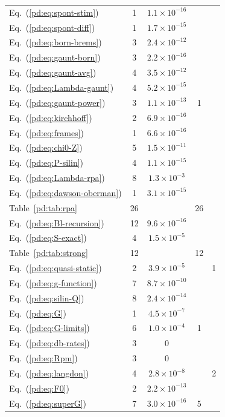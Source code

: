 \begin{longtable}{L{4.0cm}cccc}
Eq.~(\ref*{pd:eq:spont-stim}) & 1 & $1.1\times10^{-16}$ &  & \\
Eq.~(\ref*{pd:eq:spont-diff}) & 1 & $1.7\times10^{-15}$ &  & \\
Eq.~(\ref*{pd:eq:born-brems}) & 3 & $2.4\times10^{-12}$ &  & \\
Eq.~(\ref*{pd:eq:gaunt-born}) & 3 & $2.2\times10^{-16}$ &  & \\
Eq.~(\ref*{pd:eq:gaunt-avg}) & 4 & $3.5\times10^{-12}$ &  & \\
Eq.~(\ref*{pd:eq:Lambda-gaunt}) & 4 & $5.2\times10^{-15}$ &  & \\
Eq.~(\ref*{pd:eq:gaunt-power}) & 3 & $1.1\times10^{-13}$ & 1 & \\
Eq.~(\ref*{pd:eq:kirchhoff}) & 2 & $6.9\times10^{-16}$ &  & \\
Eq.~(\ref*{pd:eq:frames}) & 1 & $6.6\times10^{-16}$ &  & \\
Eq.~(\ref*{pd:eq:chi0-Z}) & 5 & $1.5\times10^{-11}$ &  & \\
Eq.~(\ref*{pd:eq:P-silin}) & 4 & $1.1\times10^{-15}$ &  & \\
Eq.~(\ref*{pd:eq:Lambda-rpa}) & 8 & $1.3\times10^{-3}$ &  & \\
Eq.~(\ref*{pd:eq:dawson-oberman}) & 1 & $3.1\times10^{-15}$ &  & \\
Table~\ref*{pd:tab:rpa} & 26 &  & 26 & \\
Eq.~(\ref*{pd:eq:Bl-recursion}) & 12 & $9.6\times10^{-16}$ &  & \\
Eq.~(\ref*{pd:eq:S-exact}) & 4 & $1.5\times10^{-5}$ &  & \\
Table~\ref*{pd:tab:strong} & 12 &  & 12 & \\
Eq.~(\ref*{pd:eq:quasi-static}) & 2 & $3.9\times10^{-5}$ &  & 1\\
Eq.~(\ref*{pd:eq:g-function}) & 7 & $8.7\times10^{-10}$ &  & \\
Eq.~(\ref*{pd:eq:silin-Q}) & 8 & $2.4\times10^{-14}$ &  & \\
Eq.~(\ref*{pd:eq:G}) & 1 & $4.5\times10^{-7}$ &  & \\
Eq.~(\ref*{pd:eq:G-limits}) & 6 & $1.0\times10^{-4}$ & 1 & \\
Eq.~(\ref*{pd:eq:db-rates}) & 3 & $0$ &  & \\
Eq.~(\ref*{pd:eq:Rpm}) & 3 & $0$ &  & \\
Eq.~(\ref*{pd:eq:langdon}) & 4 & $2.8\times10^{-8}$ &  & 2\\
Eq.~(\ref*{pd:eq:F0}) & 2 & $2.2\times10^{-13}$ &  & \\
Eq.~(\ref*{pd:eq:superG}) & 7 & $3.0\times10^{-16}$ & 5 & \\

\end{longtable}

